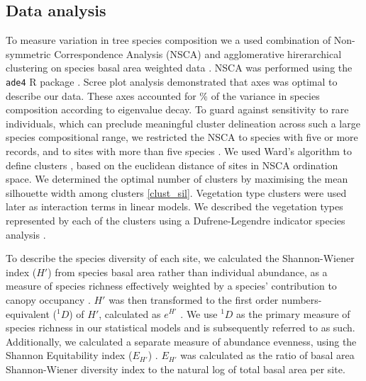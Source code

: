 \documentclass[11pt,a4paper]{article}
\begin{document}
\subsection{Data analysis}

To measure variation in tree species composition we a used combination of Non-symmetric Correspondence Analysis (NSCA) and agglomerative hirerarchical clustering on species basal area weighted data \citep{Kreft2010, Fayolle2014}. NSCA was performed using the \texttt{ade4} R package \citep{ade4}. Scree plot analysis demonstrated that \nscaAxes{} axes was optimal to describe our data. These axes accounted for \nscaInertia{}\% of the variance in species composition according to eigenvalue decay. To guard against sensitivity to rare individuals, which can preclude meaningful cluster delineation across such a large species compositional range, we restricted the NSCA to species with five or more records, and to sites with more than five species \citep{}. We used Ward's algorithm to define clusters \citep{Murtagh2014}, based on the euclidean distance of sites in NSCA ordination space. We determined the optimal number of clusters by maximising the mean silhouette width among clusters \citep{Rousseeuw1987} \autoref{clust_sil}. Vegetation type clusters were used later as interaction terms in linear models. We described the vegetation types represented by each of the clusters using a Dufrene-Legendre indicator species analysis \citep{Dufrene1997}.

To describe the species diversity of each site, we calculated the Shannon-Wiener
index ($H'$) from species basal area rather than individual abundance, as a
measure of species richness effectively weighted by a species' contribution to
canopy occupancy \citep{}. $H'$ was then transformed to the first order
numbers-equivalent ($^1\!D$) of $H'$, calculated as $e^{H'}$ \citep{}. We use
$^1\!D$ as the primary measure of species richness in our statistical models and
is subsequently referred to as such. Additionally, we calculated a separate
measure of abundance evenness, using the Shannon Equitability index ($E_{H'}$)
\citep{Smith1996}. $E_{H'}$ was calculated as the ratio of basal area
Shannon-Wiener diversity index to the natural log of total basal area per site.
\end{document}
